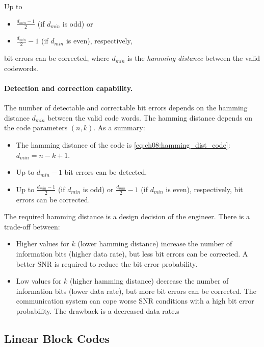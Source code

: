 \begin{refsection}
\begin{fact}
	Up to
	\begin{itemize}
		\item $\frac{d_{min}-1}{2}$ (if $d_{min}$ is odd) or
		\item $\frac{d_{min}}{2} - 1$ (if $d_{min}$ is even), respectively,
	\end{itemize} 
	bit errors can be corrected, where $d_{min}$ is the \emph{hamming distance} between the valid codewords.
\end{fact}

\paragraph{Detection and correction capability.}

The number of detectable and correctable bit errors depends on the hamming distance $d_{min}$ between the valid code words. The hamming distance depends on the code parameters $(n, k)$. As a summary:
\begin{itemize}
	\item The hamming distance of the code is \eqref{eq:ch08:hamming_dist_code}: $d_{min} = n - k + 1$.
	\item Up to $d_{min} - 1$ bit errors can be detected.
	\item Up to $\frac{d_{min}-1}{2}$ (if $d_{min}$ is odd) or $\frac{d_{min}}{2} - 1$ (if $d_{min}$ is even), respectively, bit errors can be corrected.
\end{itemize}

The required hamming distance is a design decision of the engineer. There is a trade-off between:
\begin{itemize}
	\item Higher values for $k$ (lower hamming distance) increase the number of information bits (higher data rate), but less bit errors can be corrected. A better \ac{SNR} is required to reduce the bit error probability.
	\item Low values for $k$ (higher hamming distance) decrease the number of information bits (lower data rate), but more bit errors can be corrected. The communication system can cope worse \ac{SNR} conditions with a high bit error probability. The drawback is a decreased data rate.s
\end{itemize}


\subsection{Linear Block Codes}


\end{refsection}
